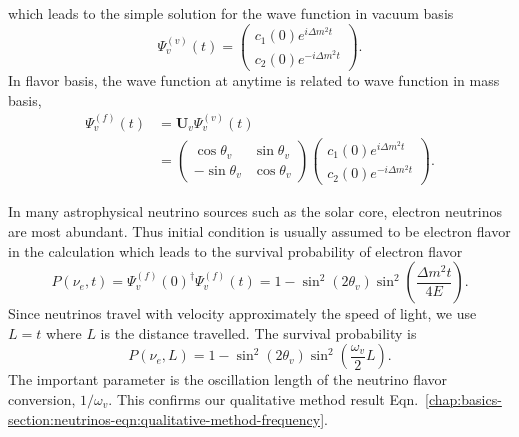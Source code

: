 which leads to the simple solution for the wave function in vacuum basis
\begin{equation}
\Psi_v^{(v)}(t) = \begin{pmatrix}
c_1(0) e^{i\Delta m^2 t } \\
c_2(0) e^{ -i\Delta m^2 t } 
\end{pmatrix}.
\end{equation}
In flavor basis, the wave function at anytime is related to wave function in mass basis,
\begin{align}
\Psi_v^{(f)}(t) &= \mathbf{U}_v\Psi_v^{(v)}(t) \\
& = \begin{pmatrix} \cos\theta_v & \sin \theta_v \\ -\sin \theta_v & \cos \theta_v \end{pmatrix} \begin{pmatrix} c_1(0) e^{i\Delta m^2 t } \\
c_2(0) e^{ -i\Delta m^2 t }    \end{pmatrix} .
\end{align}

In many astrophysical neutrino sources such as the solar core, electron neutrinos are most abundant. Thus initial condition is usually assumed to be electron flavor in the calculation which leads to the survival probability of electron flavor
\begin{equation}
P(\nu_e,t) = \Psi_v^{(f)}(0)^\dagger \Psi_v^{(f)}(t) = 1-\sin^2(2\theta_v)\sin^2\left( \frac{\Delta m^2 t}{4E} \right).
\end{equation}
Since neutrinos travel with velocity approximately the speed of light, we use $L = t$ where $L$ is the distance travelled. The survival probability is
\begin{equation}
P(\nu_e,L) =  1-\sin^2(2\theta_v)\sin^2\left( \frac{\omega_v}{2} L \right).
\end{equation}
The important parameter is the oscillation length of the neutrino flavor conversion, $1/\omega_v$. This confirms our qualitative method result Eqn.~\ref{chap:basics-section:neutrinos-eqn:qualitative-method-frequency}.

